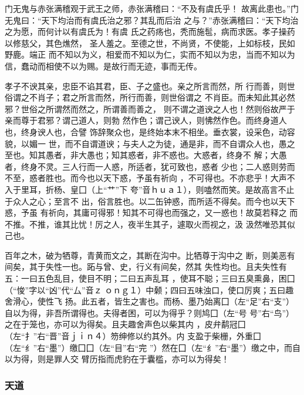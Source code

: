 \documentclass[]{article}
\begin{document}
门无鬼与赤张满稽观于武王之师，赤张满稽曰：``不及有虞氏乎！
故离此患也。''门无鬼曰：``天下均治而有虞氏治之邪？其乱而后治
之与？''赤张满稽曰：``天下均治之为愿，而何计以有虞氏为！有虞
氏之药疡也，秃而施髢，病而求医。孝子操药以修慈父，其色燋然，
圣人羞之。至德之世，不尚贤，不使能，上如标枝，民如野鹿。端正
而不知以为义，相爱而不知以为仁，实而不知以为忠，当而不知以为
信，蠢动而相使不以为赐。是故行而无迹，事而无传。

孝子不谀其亲，忠臣不谄其君，臣、子之盛也。亲之所言而然，所
行而善，则世俗谓之不肖子；君之所言而然，所行而善，则世俗谓之
不肖臣。而未知此其必然邪？世俗之所谓然而然之，所谓善而善之，
则不谓之道谀之人也！然则俗故严于亲而尊于君邪？谓己道人，则勃
然作色；谓己谀人，则怫然作色。而终身道人也，终身谀人也，合譬
饰辞聚众也，是终始本末不相坐。垂衣裳，设采色，动容貌，以媚一
世，而不自谓道谀；与夫人之为徒，通是非，而不自谓众人也，愚之
至也。知其愚者，非大愚也；知其惑者，非不惑也。大惑者，终身不
解；大愚者，终身不灵。三人行而一人惑，所适者，犹可致也，惑者
少也；二人惑则劳而不至，惑者胜也。而今也以天下惑，予虽有祈向
，不可得也。不亦悲乎！大声不入于里耳，折杨、皇囗（上``艹''下
夸''音ｈｕａ１），则嗑然而笑。是故高言不止于众人之心；至言不
出，俗言胜也。以二缶钟惑，而所适不得矣。而今也以天下惑，予虽
有祈向，其庸可得邪！知其不可得也而强之，又一惑也！故莫若释之
而不推。不推，谁其比忧！厉之人，夜半生其子，遽取火而视之，汲
汲然唯恐其似己也。

百年之木，破为牺尊，青黄而文之，其断在沟中。比牺尊于沟中之
断，则美恶有间矣，其于失性一也。跖与曾、史，行义有间矣，然其
失性均也。且夫失性有五：一曰五色乱目，使目不明；二曰五声乱耳
，使耳不聪；三曰五臭熏鼻，困囗（``悛''字以``凶''代``厶''音ｚ
ｏｎｇ１）中颡；四曰五味浊口，使口厉爽；五曰趣舍滑心，使性飞
扬。此五者，皆生之害也。而杨、墨乃始离囗（左``足''右``支''）
自以为得，非吾所谓得也。夫得者困，可以为得乎？则鸠囗（左``号
号''右``鸟''）之在于笼也，亦可以为得矣。且夫趣舍声色以柴其内
，皮弁鹬冠囗（左``扌''右``晋''音ｊｉｎ４）笏绅修以约其外。内
支盈于柴栅，外重囗（左``纟''右``墨''）缴囗囗（左``目''右``完
''）然在囗（左``纟''右``墨''）缴之中，而自以为得，则是罪人交
臂历指而虎豹在于囊槛，亦可以为得矣！

\hypertarget{header-n747}{%
\subsubsection{天道}\label{header-n747}}
\end{document}
